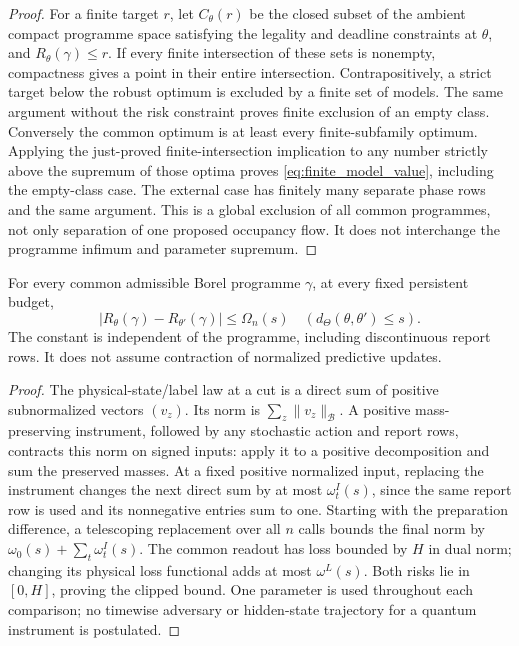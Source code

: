 \begin{proof}
For a finite target $r$, let $C_\theta(r)$ be the closed subset of the ambient compact programme space satisfying the legality and deadline constraints at $\theta$, and $R_\theta(\gamma)\le r$. If every finite intersection of these sets is nonempty, compactness gives a point in their entire intersection. Contrapositively, a strict target below the robust optimum is excluded by a finite set of models. The same argument without the risk constraint proves finite exclusion of an empty class. Conversely the common optimum is at least every finite-subfamily optimum. Applying the just-proved finite-intersection implication to any number strictly above the supremum of those optima proves \eqref{eq:finite_model_value}, including the empty-class case. The external case has finitely many separate phase rows and the same argument. This is a global exclusion of all common programmes, not only separation of one proposed occupancy flow. It does not interchange the programme infimum and parameter supremum.
\end{proof}

\begin{lemma}\label{lem:uniform_modulus}
For every common admissible Borel programme $\gamma$, at every fixed persistent budget,
\begin{equation}\label{eq:uniform_modulus}
             |R_\theta(\gamma)-R_{\theta'}(\gamma)|\le\Omega_n(s)
                 \quad(d_\Theta(\theta,\theta')\le s).
\end{equation}
The constant is independent of the programme, including discontinuous report rows. It does not assume contraction of normalized predictive updates.
\end{lemma}
\begin{proof}
The physical-state/label law at a cut is a direct sum of positive subnormalized vectors $(v_z)$. Its norm is $\sum_z\|v_z\|_{\mathcal B}$. A positive mass-preserving instrument, followed by any stochastic action and report rows, contracts this norm on signed inputs: apply it to a positive decomposition and sum the preserved masses. At a fixed positive normalized input, replacing the instrument changes the next direct sum by at most $\omega_t^I(s)$, since the same report row is used and its nonnegative entries sum to one. Starting with the preparation difference, a telescoping replacement over all $n$ calls bounds the final norm by $\omega_0(s)+\sum_t\omega_t^I(s)$. The common readout has loss bounded by $H$ in dual norm; changing its physical loss functional adds at most $\omega^L(s)$. Both risks lie in $[0,H]$, proving the clipped bound. One parameter is used throughout each comparison; no timewise adversary or hidden-state trajectory for a quantum instrument is postulated.
\end{proof}

